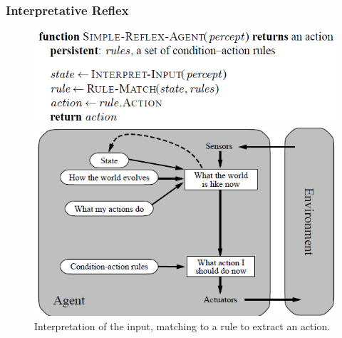 \documentclass{article}
\begin{document}
\subsubsection{Interpretative Reflex}
\begin{figure}[h!]
\includegraphics[scale=0.5]{2.png}
\includegraphics[scale=0.5]{3.png}
Interpretation of the input, matching to a rule to extract an action.
\end{figure}
\end{document}
